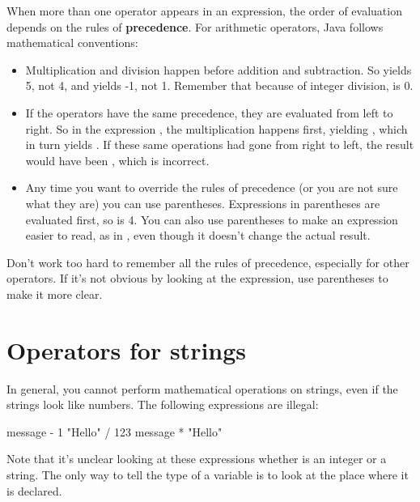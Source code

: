When more than one operator appears in an expression, the order of evaluation depends on the rules of {\bf precedence}.
For arithmetic operators, Java follows mathematical conventions:

\begin{itemize}

\item Multiplication and division happen before addition and subtraction.
So  yields 5, not 4, and  yields -1, not 1.
Remember that because of integer division,  is 0.

\item If the operators have the same precedence, they are evaluated from left to right.
So in the expression , the multiplication happens first, yielding , which in turn yields .
If these same operations had gone from right to left, the result would have been , which is incorrect.

\item Any time you want to override the rules of precedence (or you are not sure what they are) you can use parentheses.
Expressions in parentheses are evaluated first, so  is 4.
You can also use parentheses to make an expression easier to read, as in , even though it doesn't change the actual result.

\end{itemize}

Don't work too hard to remember all the rules of precedence, especially for other operators.
If it's not obvious by looking at the expression, use parentheses to make it more clear.


\section{Operators for strings}


In general, you cannot perform mathematical operations on strings, even if the strings look like numbers.
The following expressions are illegal:

\begin{code}
    message - 1     "Hello" / 123     message * "Hello"
\end{code}

Note that it's unclear looking at these expressions whether  is an integer or a string.
The only way to tell the type of a variable is to look at the place where it is declared.

